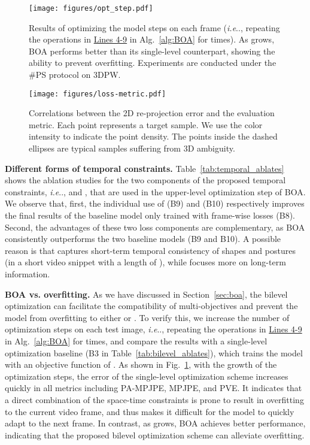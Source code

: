 \documentclass[10pt,journal,compsoc]{IEEEtran}
\makeatletter
\let\MYoriglatexcaption\caption
\renewcommand{\caption}[2][\relax]{\MYoriglatexcaption[#2]{#2}}
\DeclareRobustCommand\onedot{\futurelet\@let@token\@onedot}
\def\@onedot{\ifx\@let@token.\else.\null\fi\xspace}
\def\ie{\emph{i.e}\onedot} \def\Ie{\emph{I.e}\onedot}
\newcommand{\sect}[1]{Section~\ref{#1}}
\newcommand{\tab}[1]{Table~\ref{#1}}
\newcommand{\fig}[1]{Fig.~\ref{#1}}
\newcommand{\alg}[1]{Alg.~\ref{#1}}
\newcommand{\myparagraph}[1]{\vspace{5pt} \noindent \textbf{#1}}
\makeatother
\begin{document}
\begin{figure}[t]
    \centering
    \texttt{[image: figures/opt\_step.pdf]}
    \vspace{-15pt}
    \caption{Results of optimizing the model  steps on each frame (\ie, repeating the operations in \underline{Lines 4-9} in \alg{alg:BOA} for  times). As  grows, BOA performs better than its single-level counterpart, showing the ability to prevent overfitting. Experiments are conducted under the \#PS protocol on 3DPW.
    }
    \label{fig:overfit_ablates}
\end{figure}




\begin{figure}[t]
    \centering
    \texttt{[image: figures/loss-metric.pdf]}
    \vspace{-5pt}
    \caption{Correlations between the 2D re-projection error and the evaluation metric. Each point represents a target sample. We use the color intensity to indicate the point density. The points inside the dashed ellipses are typical samples suffering from 3D ambiguity.
    }
    \label{fig:loss-metric}
\end{figure}



\myparagraph{Different forms of temporal constraints.} 
Table~\ref{tab:temporal_ablates} shows the ablation studies for the two components of the proposed temporal constraints, \ie,  and , that are used in the upper-level optimization step of BOA. 
We observe that, first, the individual use of  (B9) and  (B10) respectively improves the final results of the baseline model only trained with frame-wise losses (B8).
Second, the advantages of these two loss components are complementary, as BOA consistently outperforms the two baseline models (B9 and B10).
A possible reason is that  captures short-term temporal consistency of shapes and postures (in a short video snippet with a length of ), while  focuses more on long-term information.




\myparagraph{BOA vs. overfitting.} 
As we have discussed in \sect{sec:boa}, the bilevel optimization can facilitate the compatibility of multi-objectives and prevent the model from overfitting to either  or .  
To verify this, we increase the number of optimization steps on each test image, \ie, repeating the operations in \underline{Lines 4-9} in \alg{alg:BOA} for  times, and compare the results with a single-level optimization baseline (B3 in \tab{tab:bilevel_ablates}), which trains the model with an objective function of .
As shown in \fig{fig:overfit_ablates}, with the growth of the optimization steps, the error of the single-level optimization scheme increases quickly in all metrics including PA-MPJPE, MPJPE, and PVE. It indicates that a direct combination of the space-time constraints is prone to result in overfitting to the current video frame, and thus makes it difficult for the model to quickly adapt to the next frame. 
In contrast, as  grows, BOA achieves better performance, indicating that the proposed bilevel optimization scheme can alleviate overfitting.
\end{document}
